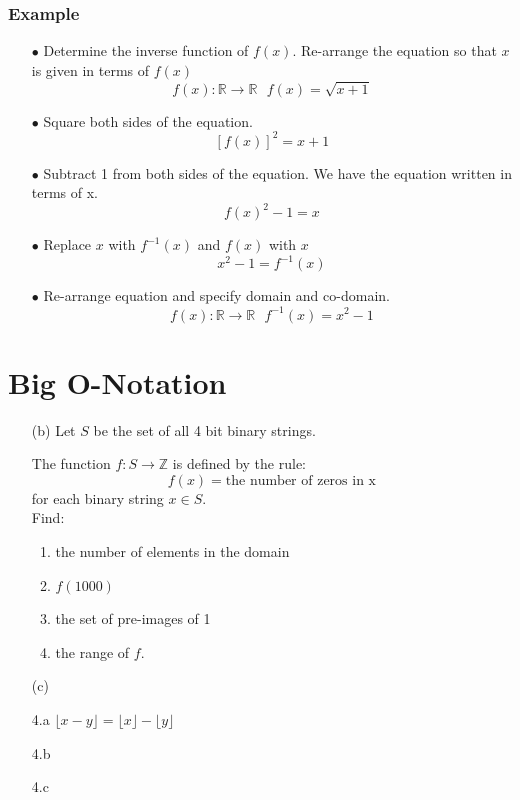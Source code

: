 \documentclass[]{report}
\begin{document}
\subsubsection{Example}
\begin{itemize}
\item[$\bullet$]Determine the inverse function of $f(x)$. Re-arrange the equation so that $x$ is given in terms of $f(x)$
\[  f(x): \mathbb{R} \rightarrow \mathbb{R}  \mbox{   } f(x)  = \sqrt{x+1} \]
\item[$\bullet$] Square both sides of the equation.
\[[f(x)]^2 = x+1 \]
\item[$\bullet$] Subtract 1 from both sides of the equation. We have the equation written in terms of x.
\[f(x)^2-1 = x \]
\item[$\bullet$] Replace $x$ with $f^{-1}(x)$ and $f(x)$ with $x$
\[x^2-1 = f^{-1}(x) \]
\item[$\bullet$] 
Re-arrange equation and specify domain and co-domain.
\[ f(x): \mathbb{R} \rightarrow \mathbb{R}  \mbox{   }  f^{-1}(x) = x^2-1  \]
\end{itemize}
\newpage
\section{Big O-Notation}

\begin{itemize}
\item[(b)] Let $S$ be the set of all 4 bit binary strings. 

The function $f : S \rightarrow \mathbb{Z}$
is defined by the rule:
\[f(x) = \mbox{the number of zeros in x}\]
for each binary string $x \in S$.\\
Find:
\begin{enumerate}
\item the number of elements in the domain
\item $f(1000)$
\item the set of pre-images of 1
\item the range of $f$.
\end{enumerate}
\item[(c)]
\end{itemize}
\newpage
\begin{itemize}
\item[4.a] $ \lfloor x - y \rfloor = \lfloor x \rfloor - \lfloor y \rfloor$
\item[4.b]
\item[4.c]
\end{itemize}
\newpage
\end{document}
